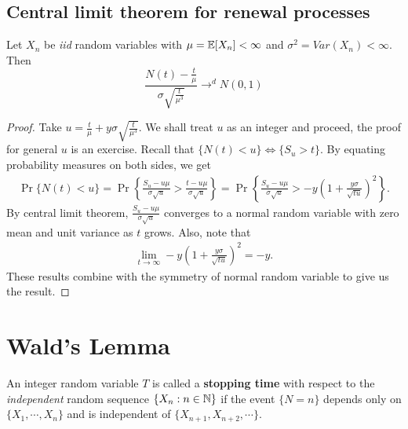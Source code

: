 \documentclass[a4paper,10pt, english]{article}
\begin{document}
\subsection{Central limit theorem for renewal processes}
\begin{thm}
Let $X_n$ be \textit{iid} random variables with $\mu = \mathbb{E}[X_n] < \infty$ and $\sigma^2 = Var(X_n) < \infty$. Then
\[\frac{N(t)-\frac{t}{\mu}}{\sigma \sqrt{\frac{t}{\mu^3}}} \to^d N(0,1) \]
\end{thm}
\begin{proof}
Take $u = \frac{t}{\mu} + y \sigma \sqrt{\frac{t}{\mu^3}}$. We shall treat $u$ as an integer and proceed, the proof for general $u$ is an exercise. Recall that $\{N(t) < u\} \iff \{S_u > t\}$. By equating probability measures on both sides, we get
\begin{align*}
\Pr\{N(t) < u\} = \Pr\left\{\frac{S_u - u\mu}{\sigma \sqrt{u}} > \frac{t - u\mu}{\sigma \sqrt{u}}\right\} = \Pr\left\{\frac{S_u - u\mu}{\sigma \sqrt{u}} > -y\left(1 + \frac{y\sigma}{\sqrt{tu}}\right)^2\right\}.
\end{align*}
By central limit theorem, $\frac{S_u - u\mu}{\sigma \sqrt{u}}$ converges to a normal random variable with zero mean and unit variance as $t$ grows. Also, note that 
\begin{align*}
\lim_{t \to \infty} -y\left(1 + \frac{y\sigma}{\sqrt{tu}}\right)^2 = -y.
\end{align*}
These results combine with the symmetry of normal random variable to give us the result.
\end{proof}

\appendix
\section{Wald's Lemma}
An integer random variable $T$ is called a \textbf{stopping time} with respect to the \textit{independent} random sequence $\{X_n: n \in \mathbb{N}\}$ if the event $\{N=n\}$ depends only on $\{X_1,\cdots,X_n\}$ and is independent of $\{X_{n+1}, X_{n+2},\cdots\}$. 
\end{document}
